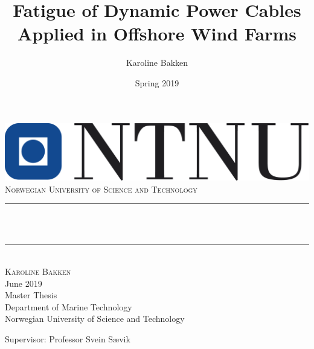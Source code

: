 \documentclass{report}
\title{Fatigue of Dynamic Power Cables Applied in Offshore Wind Farms}								%
\author{Karoline Bakken}								%
\date{Spring 2019}											%
\makeatletter
\let\thetitle\@title
\makeatother
\begin{document}
\begin{titlepage}
	\centering
    \vspace*{0.5 cm}
    \includegraphics[scale = 0.3]{figures/ntnuu}\\[1.0 cm]	%
    \textsc{\LARGE Norwegian University of Science \newline\newline and Technology}\\[2.0 cm]	%
	\rule{\linewidth}{0.2 mm} \\[0.4 cm]
	{\huge \bfseries \thetitle}\\
	\rule{\linewidth}{0.2 mm} \\[1.5 cm]
	
	\textsc{\Large Karoline Bakken}\\[0.5 cm]
	\Large{June 2019}\\[1.5 cm]
	Master Thesis\\
	Department of Marine Technology \\
	Norwegian University of Science and Technology
	\vfill
		\begin{flushleft} Supervisor: Professor Svein Sævik
		\end{flushleft}
	 
	 
	 

    
    
    
    
	
\end{titlepage}
\end{document}
